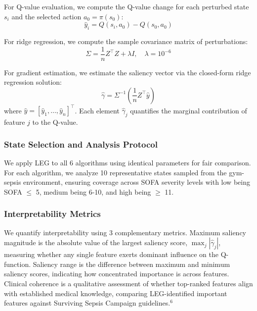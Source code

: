 For Q-value evaluation, we compute the Q-value change for each perturbed state $s_i$ and the selected action $a_0 = \pi(s_0)$:
\begin{equation}
\hat{y}_i = Q(s_i, a_0) - Q(s_0, a_0)
\end{equation}

For ridge regression, we compute the sample covariance matrix of perturbations:
\begin{equation}
\Sigma = \frac{1}{n} Z^\top Z + \lambda I, \quad \lambda = 10^{-6}
\end{equation}

For gradient estimation, we estimate the saliency vector via the closed-form ridge regression solution:
\begin{equation}
\hat{\gamma} = \Sigma^{-1} \left( \frac{1}{n} Z^\top \hat{y} \right)
\end{equation}
where $\hat{y} = [\hat{y}_1, \ldots, \hat{y}_n]^\top$. Each element $\hat{\gamma}_j$ quantifies the marginal contribution of feature $j$ to the Q-value.

\subsubsection{State Selection and Analysis Protocol}

We apply LEG to all 6 algorithms using identical parameters for fair comparison. For each algorithm, we analyze 10 representative states sampled from the gym-sepsis environment, ensuring coverage across SOFA severity levels with low being SOFA $\leq$ 5, medium being 6-10, and high being $\geq$ 11.

\subsubsection{Interpretability Metrics}

We quantify interpretability using 3 complementary metrics. Maximum saliency magnitude is the absolute value of the largest saliency score, $\max_j |\hat{\gamma}_j|$, measuring whether any single feature exerts dominant influence on the Q-function. Saliency range is the difference between maximum and minimum saliency scores, indicating how concentrated importance is across features. Clinical coherence is a qualitative assessment of whether top-ranked features align with established medical knowledge, comparing LEG-identified important features against Surviving Sepsis Campaign guidelines.$^{6}$

